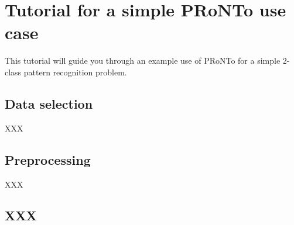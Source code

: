 \chapter{Tutorial for a simple PRoNTo use case}

This tutorial will guide you through an example use of PRoNTo for a simple 2-class
pattern recognition problem.

\section{Data selection}

XXX

\section{Preprocessing}

XXX

\section{XXX}
